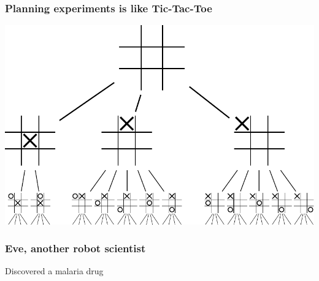\documentclass{beamer}
\begin{document}
\begin{frame}
  \frametitle{Planning experiments is like Tic-Tac-Toe}
  \begin{center}
    \includegraphics[width=\textwidth]{../figures/Tic-tac-toe-game-tree}
  \end{center}
\end{frame}

\begin{frame}
  \frametitle{Eve, another robot scientist}
  \centering {}
  Discovered a malaria drug
\end{frame}
\end{document}
